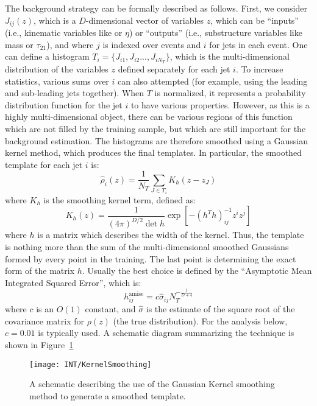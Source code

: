 The background strategy can be formally described as follows. First, we consider $J_{ij}(z)$, which is a $D$-dimensional vector of variables $z$, which can be ``inputs'' (i.e., kinematic variables like \pt or $\eta$) or ``outputs'' (i.e., substructure variables like mass or $\tau_{21}$), and where $j$ is indexed over events and $i$ for jets in each event. One can define a histogram $T_i = \{J_{i1}, J_{i2}..., J_{iN_T}\}$, which is the multi-dimensional distribution of the variables $z$ defined separately for each jet $i$. To increase statistics, various sums over $i$ can also attempted (for example, using the leading and sub-leading jets together). When $T$ is normalized, it represents a probability distribution function for the jet $i$ to have various properties. However, as this is a highly multi-dimensional object, there can be various regions of this function which are not filled by the training sample, but which are still important for the background estimation. The histograms are therefore smoothed using a Gaussian kernel method, which produces the final templates. In particular, the smoothed template for each jet $i$ is:
%
\begin{equation}
\hat{\rho}_i(z) = \frac{1}{N_T} \sum_{J\in T_i} K_h(z - z_J)
\end{equation}
%
where $K_h$ is the smoothing kernel term, defined as:
%
\begin{equation}
K_h(z) = \frac{1}{(4\pi)^{D/2} \det h} \exp \left[ - \left(h^T h \right)^{-1}_{ij} z^i z^j \right]
\end{equation}
% 
where $h$ is a matrix which describes the width of the kernel. Thus, the template is nothing more than the sum of the multi-dimensional smoothed Gaussians formed by every point in the training. The last point is determining the exact form of the matrix $h$. Usually the best choice is defined by the ``Asymptotic Mean Integrated Squared Error'', which is:
%
\begin{equation}
h_{ij}^\mathrm{amise} = c \hat{\sigma}_{ij} N_T^{-\frac{1}{D+4}}
\end{equation}
%
where $c$ is an $O(1)$ constant, and $\hat{\sigma}$ is the estimate of the square root of the covariance matrix for $\rho(z)$ (the true distribution). For the analysis below, $c=0.01$ is typically used. A schematic diagram summarizing the technique is shown in Figure~\ref{fig:search:substructure:smoothing}


\begin{figure}
\centering
\texttt{[image: INT/KernelSmoothing]}
\label{fig:search:substructure:smoothing}
\caption{A schematic describing the use of the Gaussian Kernel smoothing method to generate a smoothed template.}
\end{figure}

